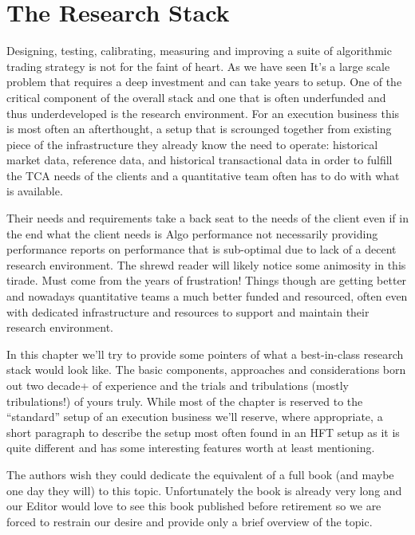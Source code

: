 \chapter{The Research Stack}\label{chap:ch_tech_res}

Designing, testing, calibrating, measuring and improving a suite of algorithmic trading strategy is not for the faint of heart. As we have  seen It's a large scale problem that requires a deep investment and can take years to setup. One of the critical component of the overall stack and one that is often underfunded and thus underdeveloped is the research environment. For an execution business this is most often an afterthought, a setup that is scrounged together from existing piece of the infrastructure they already know the need to operate: historical market data, reference data, and historical transactional data in order to fulfill the TCA needs of the clients and a quantitative team often has to do with what is available.


Their needs and requirements take a back seat to the needs of the client even if in the end what the client needs is Algo performance not necessarily providing performance reports on  performance that is sub-optimal due to lack of a decent research environment. The shrewd reader will likely notice some animosity in this tirade. Must come from the years of frustration! Things though are getting better and nowadays quantitative teams a much better funded and resourced, often even with dedicated infrastructure and resources to support and maintain their research environment.


In this chapter we'll try to provide some pointers of what a best-in-class research stack would look like. The basic components, approaches and considerations born out two decade+  of experience and the trials and tribulations (mostly tribulations!) of yours truly. While most of the chapter is reserved to the ``standard'' setup of an execution business we'll reserve, where appropriate, a short paragraph to describe the setup most often found in an HFT setup as it is quite different and has some interesting features worth at least mentioning.


The authors wish they could dedicate the equivalent of a full book (and maybe one day they will) to this topic. Unfortunately the book is already very long and our Editor would love to see this book published before retirement so we are forced to restrain our desire and provide only a brief overview of the topic.  




